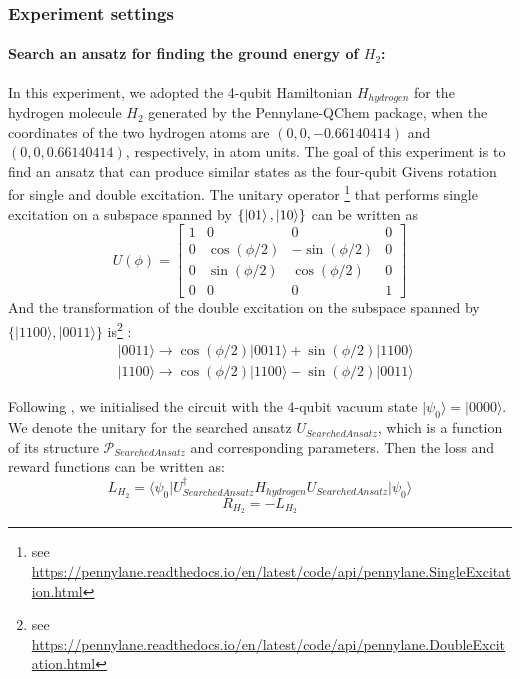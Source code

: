 \documentclass[a4paper,onecolumn,11pt]{quantumarticle}
\begin{document}
\subsubsection{Experiment settings}

\paragraph{Search an ansatz for finding the ground energy of $H_2$:}
In this experiment, we adopted the 4-qubit Hamiltonian $H_{hydrogen}$ for the hydrogen molecule $H_2$ generated by the Pennylane-QChem \cite{bergholm2020pennylane} package, when the coordinates of the two hydrogen atoms are $(0, 0, -0.66140414)$ and $(0, 0, 0.66140414)$, respectively, in atom units. The goal of this experiment is to find an ansatz that can produce similar states as the four-qubit Givens rotation for single and double excitation.
The unitary operator \footnote{see \url{https://pennylane.readthedocs.io/en/latest/code/api/pennylane.SingleExcitation.html}} that performs single excitation on a subspace spanned by $\{\ket{01}, \ket{10} \}$ can be written as 
\begin{equation}
U(\phi)=\left[\begin{array}{cccc}
1 & 0 & 0 & 0 \\
0 & \cos (\phi / 2) & -\sin (\phi / 2) & 0 \\
0 & \sin (\phi / 2) & \cos (\phi / 2) & 0 \\
0 & 0 & 0 & 1
\end{array}\right]
\end{equation}
And the transformation of the double excitation on the subspace spanned by $\{|1100\rangle,|0011\rangle\}$ is\footnote{see \url{https://pennylane.readthedocs.io/en/latest/code/api/pennylane.DoubleExcitation.html}} :
\begin{equation}
\begin{aligned}
&|0011\rangle \rightarrow \cos (\phi / 2)|0011\rangle+\sin (\phi / 2)|1100\rangle \\
&|1100\rangle \rightarrow \cos (\phi / 2)|1100\rangle-\sin (\phi / 2)|0011\rangle
\end{aligned}
\end{equation}

Following \cite{pennylane_dev_team_2021}, we initialised the circuit with the 4-qubit vacuum state $\vert \psi_0\rangle=\vert 0000\rangle$. We denote the unitary for the searched ansatz $U_{SearchedAnsatz}$, which is a function of its structure $\mathcal{P}_{SearchedAnsatz}$ and corresponding parameters. Then the loss and reward functions can be written as:
\begin{equation}
    L_{H_2} =\langle \psi_0 \vert U_{SearchedAnsatz}^{\dagger} H_{hydrogen} U_{SearchedAnsatz} \vert \psi_0\rangle
\end{equation}
\begin{equation}
    R_{H_2} = -L_{H_2}
\end{equation}
\end{document}
